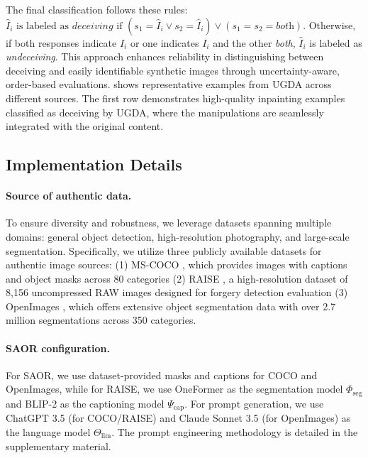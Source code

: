 The final classification follows these rules: $\hat{I}_i \text{ is labeled as } \textit{deceiving} \text{ if } (s_1 = \hat{I}_i \vee s_2 = \hat{I}_i) \vee (s_1 = s_2 = \textit{both})$. Otherwise, if both responses indicate $I_i$ or one indicates $I_i$ and the other \textit{both}, $\hat{I}_i$ is labeled as \textit{undeceiving}. This approach enhances reliability in distinguishing between deceiving and easily identifiable synthetic images through uncertainty-aware, order-based evaluations.  shows representative examples from UGDA across different sources. The first row demonstrates high-quality inpainting examples classified as deceiving by UGDA, where the manipulations are seamlessly integrated with the original content. 

\subsection{Implementation Details}
\label{sec:datasource}

\paragraph{Source of authentic data.}
To ensure diversity and robustness, we leverage datasets spanning multiple domains: general object detection, high-resolution photography, and large-scale segmentation. Specifically, we utilize three publicly available datasets for authentic image sources:
(1) MS-COCO \cite{lin2014coco}, which provides images with captions and object masks across 80 categories
(2) RAISE \cite{dang2015raise}, a high-resolution dataset of 8,156 uncompressed RAW images designed for forgery detection evaluation
(3) OpenImages \cite{benenson2022openimages}, which offers extensive object segmentation data with over 2.7 million segmentations across 350 categories.
\vspace{-14pt} 
\paragraph{SAOR configuration.}
For SAOR, we use dataset-provided masks and captions for COCO and OpenImages, while for RAISE, we use OneFormer \cite{jain2022oneformertransformerruleuniversal} as the segmentation model $\Phi_\text{seg}$ and BLIP-2 \cite{li2023blip2bootstrappinglanguageimagepretraining} as the captioning model $\Psi_\text{cap}$. For prompt generation, we use ChatGPT 3.5 \cite{openai2023chatgpt3.5} (for COCO/RAISE) and Claude Sonnet 3.5 \cite{claude2024sonnet} (for OpenImages) as the language model $\Theta_\text{llm}$. The prompt engineering methodology is detailed in the supplementary material.
\vspace{-14pt} 
